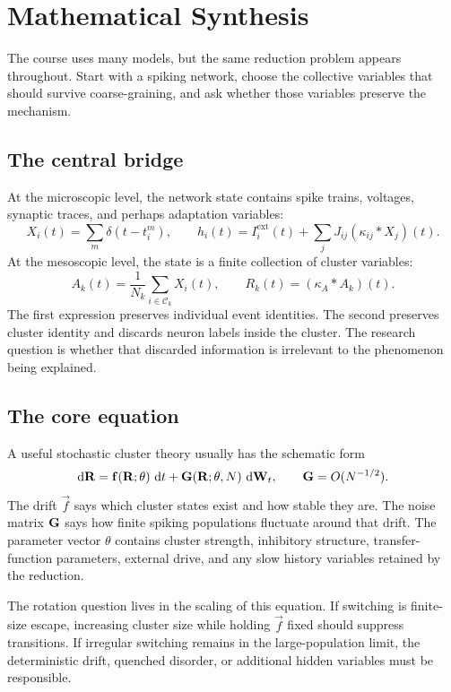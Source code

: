 \chapter*{Mathematical Synthesis}

The course uses many models, but the same reduction problem appears throughout. Start with a spiking network, choose the collective variables that should survive coarse-graining, and ask whether those variables preserve the mechanism.

\section*{The central bridge}

At the microscopic level, the network state contains spike trains, voltages, synaptic traces, and perhaps adaptation variables:
\[
  X_i(t)=\sum_m\delta(t-t_i^m),
  \qquad
  h_i(t)=I_i^{\mathrm{ext}}(t)+\sum_j J_{ij}(\kappa_{ij}*X_j)(t).
\]
At the mesoscopic level, the state is a finite collection of cluster variables:
\[
  A_k(t)=\frac{1}{N_k}\sum_{i\in\mathcal{C}_k}X_i(t),
  \qquad
  R_k(t)=(\kappa_A*A_k)(t).
\]
The first expression preserves individual event identities. The second preserves cluster identity and discards neuron labels inside the cluster. The research question is whether that discarded information is irrelevant to the phenomenon being explained.

\section*{The core equation}

A useful stochastic cluster theory usually has the schematic form
\[
  \mathop{}\!\mathrm{d} \mathbf{R}
  =
  \mathbf{f}(\mathbf{R};\theta)\,\mathop{}\!\mathrm{d} t
  +
  \mathbf{G}(\mathbf{R};\theta,N)\,\mathop{}\!\mathrm{d} \mathbf{W}_t,
  \qquad
  \mathbf{G}=O(N^{-1/2}).
\]
The drift $\vec f$ says which cluster states exist and how stable they are. The noise matrix $\mathbf{G}$ says how finite spiking populations fluctuate around that drift. The parameter vector $\theta$ contains cluster strength, inhibitory structure, transfer-function parameters, external drive, and any slow history variables retained by the reduction.

The rotation question lives in the scaling of this equation. If switching is finite-size escape, increasing cluster size while holding $\vec f$ fixed should suppress transitions. If irregular switching remains in the large-population limit, the deterministic drift, quenched disorder, or additional hidden variables must be responsible.

